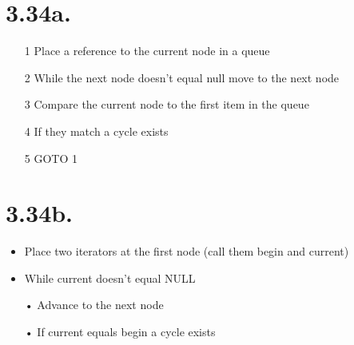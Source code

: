 \documentclass[12pt,letterpaper]{article}
\begin{document}
\section*{3.34a.}
\begin{itemize}
\item[1] Place a reference to the current node in a queue
\item[2] While the next node doesn't equal null move to the next node
\item[3] Compare the current node to the first item in the queue
\item[4] If they match a cycle exists
\item[5] GOTO 1
\end{itemize}
\section*{3.34b.}
\begin{itemize}
\item Place two iterators at the first node (call them begin and current)
\item While current doesn't equal NULL
\item[•] \hspace{.5 in} Advance to the next node
\item[•] \hspace{.5 in} If current equals begin a cycle exists
\end{itemize}
\end{document}
